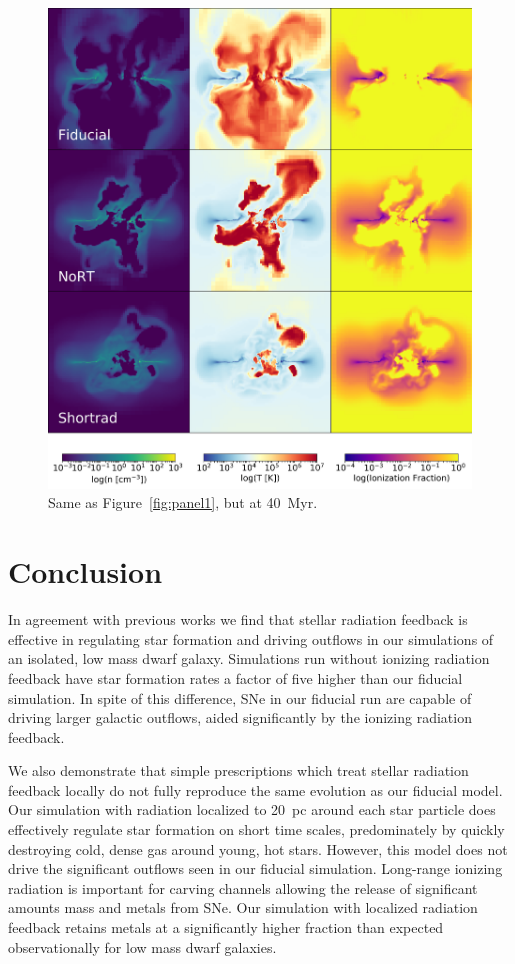 \documentclass[twocolumn]{aastex62}
\begin{document}
\begin{figure}
\centering
\includegraphics[width=0.99\linewidth]{DD0160_fiducial_shortrad_nort}
\caption{Same as Figure~\ref{fig:panel1}, but at 40~Myr.}
\label{fig:panel2}
\end{figure}

\section{Conclusion}  \label{sec:conclusion}
In agreement with previous works we find that stellar radiation feedback is effective in regulating star formation and driving outflows in our simulations of an isolated, low mass dwarf galaxy. Simulations run without ionizing radiation feedback have star formation rates a factor of five higher than our fiducial simulation. In spite of this difference, SNe in our fiducial run are capable of driving larger galactic outflows, aided significantly by the ionizing radiation feedback.

We also demonstrate that simple prescriptions which treat stellar radiation feedback locally do not fully reproduce the same evolution as our fiducial model. Our simulation with radiation localized to 20~pc around each star particle does effectively regulate star formation on short time scales, predominately by quickly destroying cold, dense gas around young, hot stars. However, this model does not drive the significant outflows seen in our fiducial simulation. Long-range ionizing radiation is important for carving channels allowing the release of significant amounts mass and metals from SNe. Our simulation with localized radiation feedback retains metals at a significantly higher fraction than expected observationally for low mass dwarf galaxies.
\end{document}
